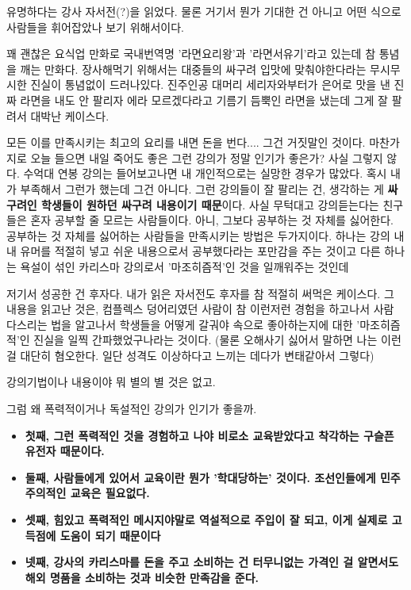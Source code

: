 \vspace{5mm}

유명하다는 강사 자서전(?)을 읽었다. 물론 거기서 뭔가 기대한 건 아니고 어떤 식으로 사람들을 휘어잡았나 보기 위해서이다.
\vspace{5mm}

꽤 괜찮은 요식업 만화로 국내번역명 '라면요리왕'과 '라면서유기'라고 있는데 참 통념을 깨는 만화다.
장사해먹기 위해서는 대중들의 싸구려 입맛에 맞춰야한다라는 무시무시한 진실이 통념없이 드러나있다.
진주인공 대머리 세리자와부터가 은어로 맛을 낸 진짜 라면을 내도 안 팔리자
에라 모르겠다라고 기름기 듬뿍인 라면을 냈는데 그게 잘 팔려서 대박난 케이스다.
\vspace{5mm}

모든 이를 만족시키는 최고의 요리를 내면 돈을 번다.... 그건 거짓말인 것이다.
마찬가지로 오늘 들으면 내일 죽어도 좋은 그런 강의가 정말 인기가 좋은가? 사실 그렇지 않다.
수억대 연봉 강의는 들어보고나면 내 개인적으로는 실망한 경우가 많았다. 혹시 내가 부족해서 그런가 했는데 그건 아니다.
그런 강의들이 잘 팔리는 건, 생각하는 게 \textbf{싸구려인 학생들이 원하던 싸구려 내용이기 때문}이다.
사실 무턱대고 강의듣는다는 친구들은 혼자 공부할 줄 모르는 사람들이다. 아니, 그보다 공부하는 것 자체를 싫어한다.
공부하는 것 자체를 싫어하는 사람들을 만족시키는 방법은 두가지이다.
하나는 강의 내내 유머를 적절히 넣고 쉬운 내용으로서 공부했다라는 포만감을 주는 것이고
다른 하나는 욕설이 섞인 카리스마 강의로서 '마조히즘적'인 것을 일깨워주는 것인데
\vspace{5mm}

저기서 성공한 건 후자다.
내가 읽은 자서전도 후자를 참 적절히 써먹은 케이스다.
그 내용을 읽고난 것은, 컴플렉스 덩어리였던 사람이 참 이런저런 경험을 하고나서 사람 다스리는 법을 알고나서
학생들을 어떻게 갈궈야 속으로 좋아하는지에 대한 '마조히즘적'인 진실을 일찍 간파했었구나라는 것이다.
(물론 오해사기 싫어서 말하면 나는 이런 걸 대단히 혐오한다. 일단 성격도 이상하다고 느끼는 데다가 변태같아서 그렇다)
\vspace{5mm}

강의기법이나 내용이야 뭐 별의 별 것은 없고.
\vspace{5mm}

그럼 왜 폭력적이거나 독설적인 강의가 인기가 좋을까.
\vspace{5mm}

\begin{itemize}
    \item \textbf{첫째, 그런 폭력적인 것을 경험하고 나야 비로소 교육받았다고 착각하는 구슬픈 유전자 때문이다.}
    \item \textbf{둘째, 사람들에게 있어서 교육이란 뭔가 '학대당하는' 것이다. 조선인들에게 민주주의적인 교육은 필요없다.}
    \item \textbf{셋째, 힘있고 폭력적인 메시지야말로 역설적으로 주입이 잘 되고, 이게 실제로 고득점에 도움이 되기 때문이다}
    \item \textbf{넷째, 강사의 카리스마를 돈을 주고 소비하는 건 터무니없는 가격인 걸 알면서도 해외 명품을 소비하는 것과 비슷한 만족감을 준다.}
\end{itemize}
\vspace{5mm}

